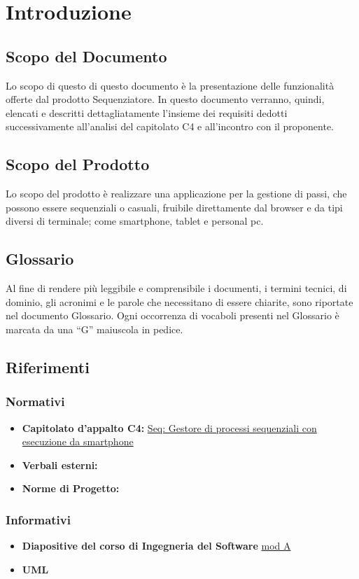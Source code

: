 \section{Introduzione}
\subsection{Scopo del Documento}
Lo scopo di questo di questo documento è la presentazione delle funzionalità offerte dal prodotto Sequenziatore. In questo documento verranno, quindi, elencati e descritti dettagliatamente l'insieme dei requisiti dedotti successivamente all'analisi del capitolato C4 e all'incontro con il proponente.
\subsection{Scopo del Prodotto}
Lo scopo del prodotto è realizzare una applicazione per la gestione di passi, che possono essere sequenziali o casuali, fruibile direttamente dal browser e da tipi diversi di terminale; come smartphone, tablet e personal pc.
\subsection{Glossario}
Al fine di rendere più leggibile e comprensibile i documenti, i termini tecnici, di dominio, gli acronimi e le parole che necessitano di
essere chiarite, sono riportate nel documento Glossario.
Ogni occorrenza di vocaboli presenti nel Glossario è marcata da una “G” maiuscola in
pedice.
\subsection{Riferimenti}
\subsubsection{Normativi}
\begin{itemize}
\item \textbf{Capitolato d'appalto C4: }\href{http://www.math.unipd.it/~tullio/IS-1/2013/Progetto/C4.pdf}{Seq: Gestore di processi sequenziali con esecuzione da smartphone}
\item \textbf{Verbali esterni: }
\item \textbf{Norme di Progetto: }\NormeDiProgetto
\end{itemize}
\subsubsection{Informativi}
\begin{itemize}
\item \textbf{Diapositive del corso di Ingegneria del Software }\href{http://www.math.unipd.it/~tullio/IS-1/2013/}{mod A}
\item \textbf{UML}
\end{itemize}